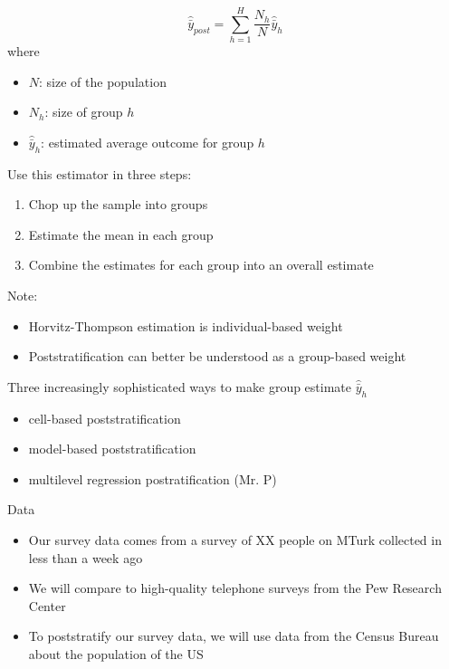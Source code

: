 \documentclass[aspectratio=169]{beamer}
\begin{document}
\begin{frame}

\begin{equation*}
\hat{\bar{y}}_{post} = \sum_{h=1}^H \frac{N_h}{N} \hat{\bar{y}}_h
\end{equation*}
where 
\begin{itemize}
\item $N$: size of the population
\item $N_h$: size of group $h$
\item $\hat{\bar{y}}_h$: estimated average outcome for group $h$
\end{itemize}
\vfill

Use this estimator in three steps:
\begin{enumerate}
\item Chop up the sample into groups \pause
\item Estimate the mean in each group \pause
\item Combine the estimates for each group into an overall estimate
\end{enumerate}

\end{frame}
\begin{frame}

Note:
\begin{itemize}
\item Horvitz-Thompson estimation is individual-based weight
\item Poststratification can better be understood as a group-based weight
\end{itemize}

\end{frame}
\begin{frame}

Three increasingly sophisticated ways to make group estimate $\hat{\bar{y}}_h$
\begin{itemize}
\item cell-based poststratification
\item model-based poststratification
\item multilevel regression postratification (Mr. P)
\end{itemize}

\end{frame}
\begin{frame}{Data}

\begin{itemize}
\item Our survey data comes from a survey of XX people on MTurk collected in less than a week ago
\item We will compare to high-quality telephone surveys from the Pew Research Center
\item To poststratify our survey data, we will use data from the Census Bureau about the population of the US
\end{itemize}

\end{frame}
\end{document}
